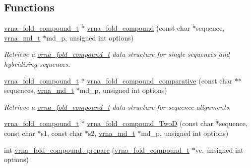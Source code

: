 \subsection*{Functions}
\begin{DoxyCompactItemize}
\item 
\mbox{\hyperlink{group__fold__compound_ga1b0cef17fd40466cef5968eaeeff6166}{vrna\+\_\+fold\+\_\+compound\+\_\+t}} $\ast$ \mbox{\hyperlink{group__fold__compound_ga6601d994ba32b11511b36f68b08403be}{vrna\+\_\+fold\+\_\+compound}} (const char $\ast$sequence, \mbox{\hyperlink{group__model__details_ga1f8a10e12a0a1915f2a4eff0b28ea17c}{vrna\+\_\+md\+\_\+t}} $\ast$md\+\_\+p, unsigned int options)
\begin{DoxyCompactList}\small\item\em Retrieve a \mbox{\hyperlink{group__fold__compound_ga1b0cef17fd40466cef5968eaeeff6166}{vrna\+\_\+fold\+\_\+compound\+\_\+t}} data structure for single sequences and hybridizing sequences. \end{DoxyCompactList}\item 
\mbox{\hyperlink{group__fold__compound_ga1b0cef17fd40466cef5968eaeeff6166}{vrna\+\_\+fold\+\_\+compound\+\_\+t}} $\ast$ \mbox{\hyperlink{group__fold__compound_gad6bacc816af274922b13d947f708aa0c}{vrna\+\_\+fold\+\_\+compound\+\_\+comparative}} (const char $\ast$$\ast$sequences, \mbox{\hyperlink{group__model__details_ga1f8a10e12a0a1915f2a4eff0b28ea17c}{vrna\+\_\+md\+\_\+t}} $\ast$md\+\_\+p, unsigned int options)
\begin{DoxyCompactList}\small\item\em Retrieve a \mbox{\hyperlink{group__fold__compound_ga1b0cef17fd40466cef5968eaeeff6166}{vrna\+\_\+fold\+\_\+compound\+\_\+t}} data structure for sequence alignments. \end{DoxyCompactList}\item 
\mbox{\hyperlink{group__fold__compound_ga1b0cef17fd40466cef5968eaeeff6166}{vrna\+\_\+fold\+\_\+compound\+\_\+t}} $\ast$ \mbox{\hyperlink{group__fold__compound_ga9d24b196753b4f9f03774f11661510f5}{vrna\+\_\+fold\+\_\+compound\+\_\+\+TwoD}} (const char $\ast$sequence, const char $\ast$s1, const char $\ast$s2, \mbox{\hyperlink{group__model__details_ga1f8a10e12a0a1915f2a4eff0b28ea17c}{vrna\+\_\+md\+\_\+t}} $\ast$md\+\_\+p, unsigned int options)
\item 
int \mbox{\hyperlink{group__fold__compound_ga3cd3a6a54a40e6d6eeb7b80c9ebdf977}{vrna\+\_\+fold\+\_\+compound\+\_\+prepare}} (\mbox{\hyperlink{group__fold__compound_ga1b0cef17fd40466cef5968eaeeff6166}{vrna\+\_\+fold\+\_\+compound\+\_\+t}} $\ast$vc, unsigned int options)
$$
\end{DoxyCompactItemize}

